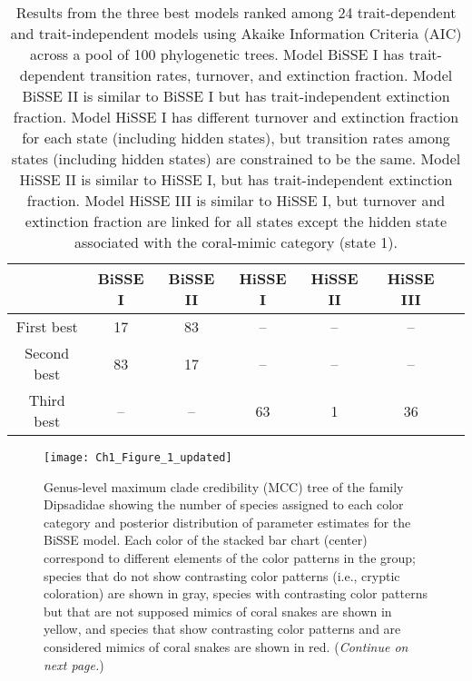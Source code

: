 \begin{table}[h]
\begin{small}
\caption[Results from the three best models ranked among 24 trait-dependent and trait-independent models using Akaike Information Criteria (AIC) across a pool of 100 phylogenetic trees.]{Results from the three best models ranked among 24 trait-dependent and trait-independent models using Akaike Information Criteria (AIC) across a pool of 100 phylogenetic trees. Model BiSSE I has trait-dependent transition rates, turnover, and extinction fraction. Model BiSSE II is similar to BiSSE I but has trait-independent extinction fraction. Model HiSSE I has different turnover and extinction fraction for each state (including hidden states), but transition rates among states (including hidden states) are constrained to be the same. Model HiSSE II is similar to HiSSE I, but has trait-independent extinction fraction. Model HiSSE III is similar to HiSSE I, but turnover and extinction fraction are linked for all states except the hidden state associated with the coral-mimic category (state 1).}
\label{tab:model_test}
\end{small}
\begin{center}
\begin{tabular}{ccccccc}
\hline 
 & BiSSE I & BiSSE II & HiSSE I & HiSSE II & HiSSE III \\ 
\hline 
First best & 17 & 83 & \--- & \--- & \--- \\ 
Second best & 83 & 17 & \--- & \--- & \--- \\
Third best & \--- & \--- & 63 & 1 & 36 \\
\hline
\end{tabular}
\end{center}
\end{table}

\pagebreak

\begin{figure}[h]
	\centering
	\texttt{[image: Ch1\_Figure\_1\_updated]}
	\caption[Genus-level maximum clade credibility (MCC) tree of the family Dipsadidae showing the number of species assigned to each color category and posterior distribution of parameter estimates for the BiSSE model.]{Genus-level maximum clade credibility (MCC) tree of the family Dipsadidae showing the number of species assigned to each color category and posterior distribution of parameter estimates for the BiSSE model. Each color of the stacked bar chart (center) correspond to different elements of the color patterns in the group; species that do not show contrasting color patterns (i.e., cryptic coloration) are shown in gray, species with contrasting color patterns but that are not supposed mimics of coral snakes are shown in yellow, and species that show contrasting color patterns and are considered mimics of coral snakes are shown in red. (\textit{Continue on next page.})}
	\label{fig:diversity_phylo} %
\end{figure}

